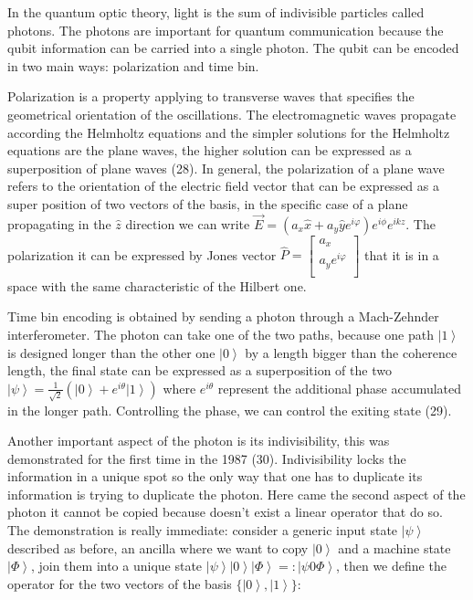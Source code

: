 In the quantum optic theory, light is the sum of indivisible particles called photons. The photons are important for quantum communication because the qubit information can be carried into a single photon. The qubit can be encoded in two main ways: polarization and time bin.

Polarization is a property applying to transverse waves that specifies the geometrical orientation of the oscillations. The electromagnetic waves propagate according the Helmholtz equations and the simpler solutions for the Helmholtz equations are the plane waves, the higher solution can be expressed as a superposition of plane waves (28). In general, the polarization of a plane wave refers to the orientation of the electric field vector that can be expressed as a super position of two vectors of the basis, in the specific case of a plane propagating in the $\hat{z}$ direction we can write $\vec{E} = (a_x \hat{x} + a_y \hat{y} e^{i \varphi}) e^{i \phi} e^{i k z}$. The polarization it can be expressed by Jones vector $\hat{P} = \begin{bmatrix} a_x \\ a_y e^{i\varphi} \\ \end{bmatrix}$ that it is in a space with the same characteristic of the Hilbert one.

Time bin encoding is obtained by sending a photon through a Mach-Zehnder interferometer. The photon can take one of the two paths, because one path $\left|1\right>$ is designed longer than the other one $\left|0\right>$ by a length bigger than the coherence length, the final state can be expressed as a superposition of the two $\left|\psi\right> = \frac{1}{\sqrt{2}} (\left|0\right> + e^{i\theta}\left|1\right>)$ where $e^{i \theta}$ represent the additional phase accumulated in the longer path. Controlling the phase, we can control the exiting state (29).

Another important aspect of the photon is its indivisibility, this was demonstrated for the first time in the 1987 (30). Indivisibility locks the information in a unique spot so the only way that one has to duplicate its information is trying to duplicate the photon. Here came the second aspect of the photon it cannot be copied because doesn't exist a linear operator that do so. The demonstration is really immediate: consider a generic input state $\left|\psi\right>$ described as before, an ancilla where we want to copy $\left|0\right>$ and a machine state $\left|\Phi\right>$, join them into a unique state $\left|\psi\right>\left|0\right>\left|\Phi\right> =: \left|\psi 0 \Phi\right>$, then we define the operator for the two vectors of the basis $\{\left|0\right>, \left|1\right>\}$:

